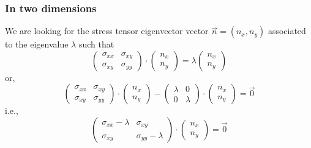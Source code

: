 \subsubsection{In two dimensions}

We are looking for the stress tensor eigenvector vector $\vec{n}=(n_x,n_y)$ associated to the
eigenvalue $\lambda$ such that 
\[
\left(
\begin{array}{cc}
\sigma_{xx} & \sigma_{xy} \\
\sigma_{xy} & \sigma_{yy} 
\end{array}
\right)
\cdot
\left(
\begin{array}{c}
n_x \\ n_y
\end{array}
\right)
=
\lambda
\left(
\begin{array}{c}
n_x \\ n_y
\end{array}
\right)
\]
or,
\[
\left(
\begin{array}{cc}
\sigma_{xx} & \sigma_{xy} \\
\sigma_{xy} & \sigma_{yy} 
\end{array}
\right)
\cdot
\left(
\begin{array}{c}
n_x \\ n_y
\end{array}
\right)
-
\left(
\begin{array}{cc}
\lambda & 0 \\ 
0 & \lambda 
\end{array}
\right)
\cdot
\left(
\begin{array}{c}
n_x \\ n_y
\end{array}
\right)
= \vec{0}
\]
i.e.,
\[
\left(
\begin{array}{cc}
\sigma_{xx}-\lambda  & \sigma_{xy} \\
\sigma_{xy} & \sigma_{yy} -\lambda 
\end{array}
\right)
\cdot
\left(
\begin{array}{c}
n_x \\ n_y
\end{array}
\right)
= \vec{0}
\]

